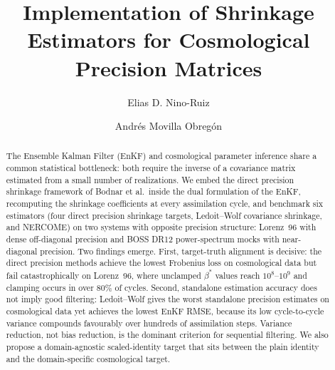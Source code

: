 \documentclass[runningheads]{llncs}
\begin{document}
\title{Implementation of Shrinkage Estimators for Cosmological Precision Matrices}


\author{Elias D. Nino-Ruiz \and
Andr\'es Movilla Obreg\'on}



\maketitle

\begin{abstract}
The Ensemble Kalman Filter (EnKF) and cosmological parameter inference share a common statistical bottleneck: both require the inverse of a covariance matrix estimated from a small number of realizations. We embed the direct precision shrinkage framework of Bodnar et al.\ inside the dual formulation of the EnKF, recomputing the shrinkage coefficients at every assimilation cycle, and benchmark six estimators (four direct precision shrinkage targets, Ledoit--Wolf covariance shrinkage, and NERCOME) on two systems with opposite precision structure: Lorenz~96 with dense off-diagonal precision and BOSS DR12 power-spectrum mocks with near-diagonal precision. Two findings emerge. First, target-truth alignment is decisive: the direct precision methods achieve the lowest Frobenius loss on cosmological data but fail catastrophically on Lorenz~96, where unclamped $\beta^*$ values reach $10^8$--$10^9$ and clamping occurs in over 80\% of cycles. Second, standalone estimation accuracy does not imply good filtering: Ledoit--Wolf gives the worst standalone precision estimates on cosmological data yet achieves the lowest EnKF RMSE, because its low cycle-to-cycle variance compounds favourably over hundreds of assimilation steps. Variance reduction, not bias reduction, is the dominant criterion for sequential filtering. We also propose a domain-agnostic scaled-identity target that sits between the plain identity and the domain-specific cosmological target.

\end{abstract}










\end{document}
